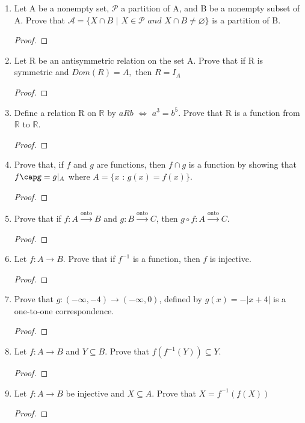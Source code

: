 \documentclass[11pt]{article}
\begin{document}
\begin{enumerate}
    \item Let A be a nonempty set, $\mathscr{P}$ a partition of A, and B be a nonempty subset of A. \newline Prove that $\mathscr{A}=\{X \cap B$ $|$ $X \in \mathscr{P}$ $and$ $X \cap B \neq \varnothing \}$ is a partition of B.
        \begin{proof}
        \end{proof}
        
    \item Let R be an antisymmetric relation on the set A. 
    \newnline Prove that if R is symmetric and $Dom(R) = A,$ then $R=I_A$
        \begin{proof}
        \end{proof}
        
    \item Define a relation R on $\mathbb{R}$ by $aRb$ $\iff$ $a^3=b^5$. Prove that R is a function from $\mathbb{R}$ to $\mathbb{R}.$
        \begin{proof}
        \end{proof}
        
    \item Prove that, if $f$ and $g$ are functions, then $f \cap g$ is a function by showing that $f\capg = g|_{A}$ where \newline $A = \{x$ : $g(x) = f(x) \}.$
        \begin{proof}
        \end{proof}
        
    \item Prove that if $f:A \xrightarrow{\text{onto}} B$ and $g:B\xrightarrow{\text{onto}} C$, then $g\circ f:A \xrightarrow{\text{onto}} C.$
        \begin{proof}
        \end{proof}
        
    \item Let $f:A\xrightarrow{} B$. Prove that if $f^{-1}$ is a function, then $f$ is injective.
        \begin{proof}
        \end{proof}
        
    \item Prove that $g:(-\infty, -4)\rightarrow(-\infty,0)$, defined by $g(x) = -|x+4|$ is a one-to-one correspondence.
        \begin{proof}
        \end{proof}
        
    \item Let $f:A \rightarrow B$ and $Y \subseteq B.$ Prove that $f(f^{-1}(Y)) \subseteq Y.$
        \begin{proof}
        \end{proof}
        
    \item Let $f:A \rightarrow B$ be injective and $X \subseteq A.$ \newline Prove that $X = f^{-1}(f(X))$ 
        \begin{proof}
        \end{proof}
    
\end{enumerate}
\end{document}
